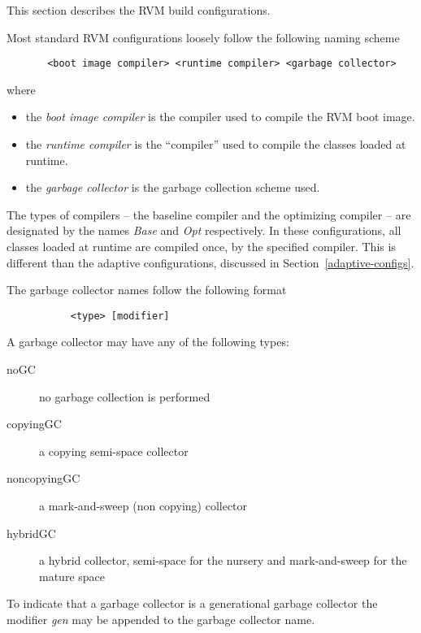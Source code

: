 This section describes the RVM build configurations.

Most standard RVM configurations loosely follow the following naming scheme
\begin{verbatim}
       <boot image compiler> <runtime compiler> <garbage collector>
\end{verbatim}

where
\begin{itemize}
\item the {\em boot image compiler} is the compiler used to compile the RVM boot image.
\item the {\em runtime compiler} is the ``compiler'' used to compile
the classes loaded at runtime.  
\item the {\em garbage collector} is the garbage collection scheme used.
\end{itemize}

The types of compilers -- the baseline compiler and 
the optimizing compiler -- are designated by the names {\em Base}
and {\em Opt} respectively.  In these configurations,
all classes loaded at runtime are compiled once, by the specified
compiler.  This is different than the adaptive configurations,
discussed in Section~\ref{adaptive-configs}.

The garbage collector names follow the following format
\begin{verbatim}
           <type> [modifier]
\end{verbatim}


A garbage collector may have any of the following types:

\begin{description}
\item[noGC] no garbage collection is performed
\item[copyingGC] a copying semi-space collector
\item[noncopyingGC] a mark-and-sweep (non copying) collector
\item[hybridGC] a hybrid collector, semi-space for the nursery and
mark-and-sweep for the mature space
\end{description}

To indicate that a garbage collector is a generational garbage collector 
the modifier {\em gen} may be appended to the garbage collector name.

